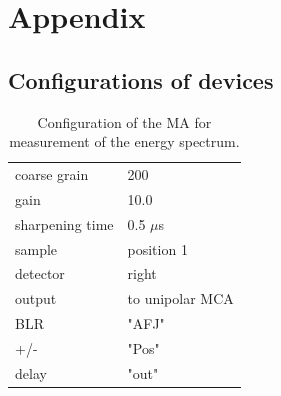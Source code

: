 \section{Appendix}
\label{sec:appendix}
\subsection{Configurations of devices}
\begin{table}[H]
    \centering
    \begin{tabular}{|l|l|}
        \hline
        coarse grain    & 200\\
        gain            &   10.0 \\
        sharpening time &   0.5 $\mu$s\\
        sample          & position 1\\
        detector        & right \\
        output          & to unipolar MCA\\
        BLR             & "AFJ" \\
        +/-             & "Pos" \\
        delay           & "out" \\
        \hline
    \end{tabular}
    \label{tab:config}
    \caption{
        Configuration of the MA for measurement of the energy spectrum.
        }
\end{table}


